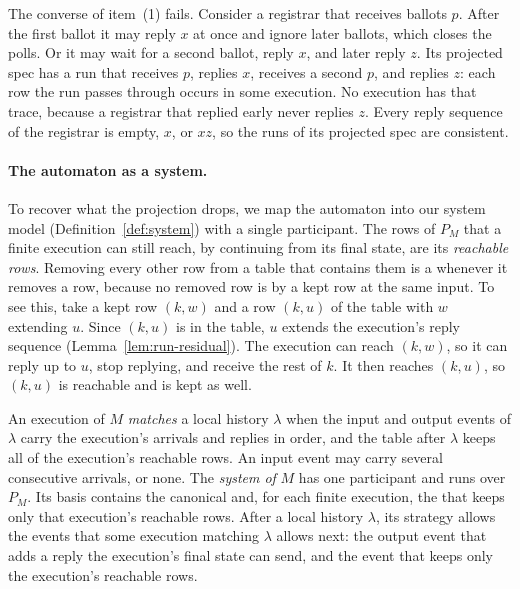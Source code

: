 The converse of item~(1) fails.  Consider a registrar that receives ballots
$p$.  After the first ballot it may reply $x$ at once and ignore later
ballots, which closes the polls.  Or it may wait for a second ballot, reply
$x$, and later reply $z$.  Its projected spec has a run that receives $p$,
replies $x$, receives a second $p$, and replies $z$: each row the run passes
through occurs in some execution.  No execution has that trace, because a
registrar that replied early never replies $z$.  Every reply sequence of the
registrar is empty, $x$, or $xz$, so the runs of its projected spec are
consistent.

\paragraph{The automaton as a system.}
To recover what the projection drops, we map the automaton into our system
model (Definition~\ref{def:system}) with a single participant.  The rows of
$P_M$ that a finite execution can still reach, by continuing from its final
state, are its \emph{reachable rows}.  Removing every other row from a table
that contains them is a \commitment whenever it removes a row, because no
removed row is \outrelpast by a kept row at the same input.  To see this, take
a kept row $(k,w)$ and a row $(k,u)$ of the table with $w$ extending $u$.
Since $(k,u)$ is in the table, $u$ extends the execution's reply sequence
(Lemma~\ref{lem:run-residual}).  The execution can reach $(k,w)$, so it can
reply up to $u$, stop replying, and receive the rest of $k$.  It then reaches
$(k,u)$, so $(k,u)$ is reachable and is kept as well.

\begin{definition}
\label{def:automaton-system}
An execution of $M$ \emph{matches} a local history $\lambda$ when the input
and output events of $\lambda$ carry the execution's arrivals and replies in
order, and the table after $\lambda$ keeps all of the execution's reachable
rows.  An input event may carry several consecutive arrivals, or none.  The
\emph{system of} $M$ has one participant and runs over $P_M$.  Its basis
contains the canonical \commitments and, for each finite execution, the
\commitment that keeps only that execution's reachable rows.  After a local
history $\lambda$, its strategy allows the events that some execution matching
$\lambda$ allows next: the output event that adds a reply the execution's
final state can send, and the \commitment event that keeps only the
execution's reachable rows.
\end{definition}

